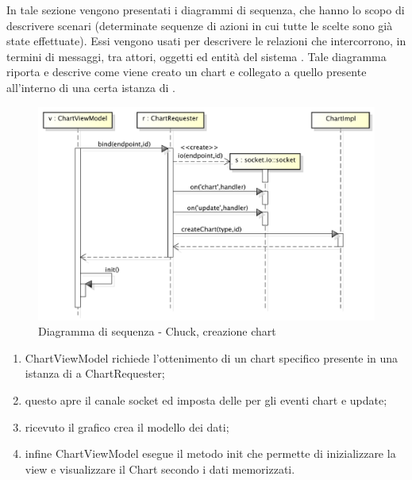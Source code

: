         In tale sezione vengono presentati i diagrammi di sequenza, che hanno lo scopo di descrivere scenari (determinate sequenze di azioni in cui tutte le scelte sono già state effettuate). Essi vengono usati per descrivere le relazioni che intercorrono, in termini di messaggi, tra attori, oggetti ed entità del sistema .
             Tale diagramma riporta e descrive come viene creato un chart e collegato a quello presente all'interno di una certa istanza di .
            \begin{figure}[H]
                \centering
                \includegraphics[scale=0.3]{DefinizioneDiProdotto/Pics/ChuckInserimentoChart}
                \caption{Diagramma di sequenza - Chuck, creazione chart}
            \end{figure}
            \begin{enumerate}
                \item ChartViewModel richiede l'ottenimento di un chart specifico presente in una istanza di  a ChartRequester;
                \item questo apre il canale socket ed imposta delle  per gli eventi chart e update;
                \item ricevuto il grafico crea il modello dei dati;
                \item infine ChartViewModel esegue il metodo init che permette di inizializzare la view e visualizzare il Chart secondo i dati memorizzati.
            \end{enumerate}

